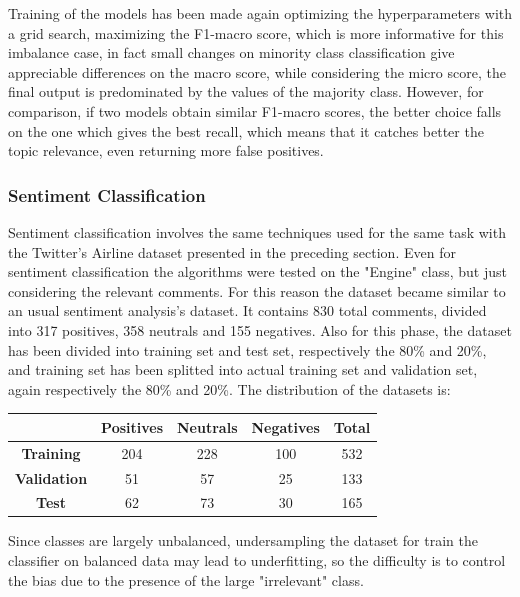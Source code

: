 Training of the models has been made again optimizing the hyperparameters with a grid search, maximizing the F1-macro score, which is more informative for this imbalance case, in fact small changes on minority class classification give appreciable differences on the macro score, while considering the micro score, the final output is predominated by the values of the majority class. However, for comparison, if two models obtain similar F1-macro scores, the better choice falls on the one which gives the best recall, which means that it catches better the topic relevance, even returning more false positives.



\subsubsection{Sentiment Classification}

Sentiment classification involves the same techniques used for the same task with the Twitter's Airline dataset presented in the preceding section. Even for sentiment classification the algorithms were tested on the "Engine" class, but just considering the relevant comments. For this reason the dataset became similar to an usual sentiment analysis's dataset. It contains 830 total comments, divided into 317 positives, 358 neutrals and 155 negatives. Also for this phase, the dataset has been divided into training set and test set, respectively the 80\% and 20\%, and training set has been splitted into actual training set and validation set, again respectively the 80\% and 20\%. The distribution of the datasets is:

\begin{center}
	\begin{tabular}{ | c  c  c c | c | } 
		\hline
		& \textbf{Positives} & \textbf{Neutrals} & \textbf{Negatives} & \textbf{Total} \\
		\hline
		\textbf{Training} & 204 & 228 & 100 & 532 \\ 
		\hline
		\textbf{Validation} & 51 & 57 & 25 & 133 \\ 
		\hline
		\textbf{Test} & 62 & 73 & 30 & 165 \\
		\hline
	\end{tabular}
\end{center}

Since classes are largely unbalanced, undersampling the dataset for train the classifier on balanced data may lead to underfitting, so the difficulty is to control the bias due to the presence of the large "irrelevant" class.



